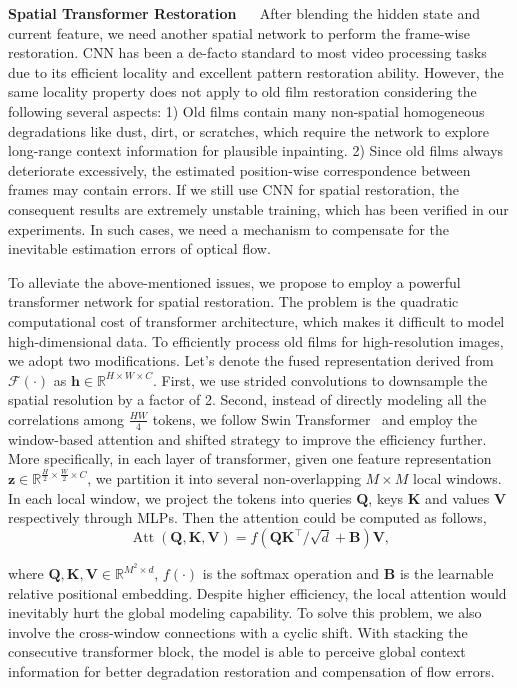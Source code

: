 \documentclass[10pt,twocolumn,letterpaper]{article}
\begin{document}
	
	\noindent\textbf{Spatial Transformer Restoration} ~~ After blending the hidden state and current feature, we need another spatial network to perform the frame-wise restoration. CNN has been a de-facto standard to most video processing tasks due to its efficient locality and excellent pattern restoration ability. However, the same locality property does not apply to old film restoration considering the following several aspects: 1) Old films contain many non-spatial homogeneous degradations like dust, dirt, or scratches, which require the network to explore long-range context information for plausible inpainting. 2) Since old films always deteriorate excessively, the estimated position-wise correspondence between frames may contain errors. If we still use CNN for spatial restoration, the consequent results are extremely unstable training, which has been verified in our experiments. In such cases, we need a mechanism to compensate for the inevitable estimation errors of optical flow.
	
	To alleviate the above-mentioned issues, we propose to employ a powerful transformer network for spatial restoration. The problem is the quadratic computational cost of transformer architecture, which makes it difficult to model high-dimensional data. To efficiently process old films for high-resolution images, we adopt two modifications. Let's denote the fused representation derived from $\mathcal{F}(\cdot)$ as $\mathbf{h}\in \mathbb{R}^{H \times W \times C}$.  First, we use strided convolutions to downsample the spatial resolution by a factor of 2. Second, instead of directly modeling all the correlations among $\frac{HW}{4}$ tokens, we follow Swin Transformer~\cite{Liu_2021_ICCV} and employ the window-based attention and shifted strategy to improve the efficiency further. More specifically, in each layer of transformer, given one feature representation $\mathbf{z}\in \mathbb{R}^{\frac{H}{2} \times \frac{W}{2} \times C}$, we partition it into several non-overlapping $M \times M$ local windows. In each local window, we project the tokens into queries $\mathbf{Q}$, keys $\mathbf{K}$ and values $\mathbf{V}$ respectively through MLPs. Then the attention could be computed as follows,
	\begin{equation}
	\operatorname{Att}(\mathbf{Q}, \mathbf{K}, \mathbf{V})=f(\mathbf{Q}\mathbf{K}^{\top} / \sqrt{d}+\mathbf{B})\mathbf{V},
	\end{equation}
	
	where $\mathbf{Q}, \mathbf{K}, \mathbf{V} \in \mathbb{R}^{M^2 \times d}$, $f(\cdot)$ is the softmax operation and $\mathbf{B}$ is the learnable relative positional embedding. Despite higher efficiency, the local attention would inevitably hurt the global modeling capability. To solve this problem, we also involve the cross-window connections with a cyclic shift. With stacking the consecutive transformer block, the model is able to perceive global context information for better degradation restoration and compensation of flow errors.
	
\end{document}
